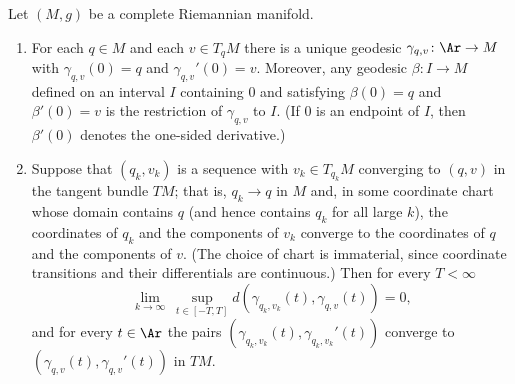 \begin{lemma}
\label{lem:geodesic-continuous-dependence}
\leanok
{}
Let $(M,g)$ be a complete Riemannian manifold.
\begin{enumerate}
\item For each $q\in M$ and each $v\in T_qM$ there is a unique geodesic
$\gamma_{q,v}\colon \Ar\to M$ with $\gamma_{q,v}(0)=q$ and
$\gamma_{q,v}'(0)=v$. Moreover, any geodesic $\beta\colon I\to M$
defined on an interval $I$ containing $0$ and satisfying $\beta(0)=q$
and $\beta'(0)=v$ is the restriction of $\gamma_{q,v}$ to $I$. (If $0$
is an endpoint of $I$, then $\beta'(0)$ denotes the one-sided
derivative.)
\item Suppose that $(q_k,v_k)$ is a sequence with $v_k\in T_{q_k}M$
converging to $(q,v)$ in the tangent bundle $TM$; that is, $q_k\to q$
in $M$ and, in some coordinate chart whose domain contains $q$ (and
hence contains $q_k$ for all large $k$), the coordinates of $q_k$ and
the components of $v_k$ converge to the coordinates of $q$ and the
components of $v$. (The choice of chart is immaterial, since
coordinate transitions and their differentials are continuous.) Then
for every $T<\infty$
$$\lim_{k\rightarrow\infty}\ \sup_{t\in[-T,T]}
d\left(\gamma_{q_k,v_k}(t),\gamma_{q,v}(t)\right)=0,$$
and for every $t\in\Ar$ the pairs
$\left(\gamma_{q_k,v_k}(t),\gamma_{q_k,v_k}'(t)\right)$ converge to
$\left(\gamma_{q,v}(t),\gamma_{q,v}'(t)\right)$ in $TM$.
\end{enumerate}
\end{lemma}


